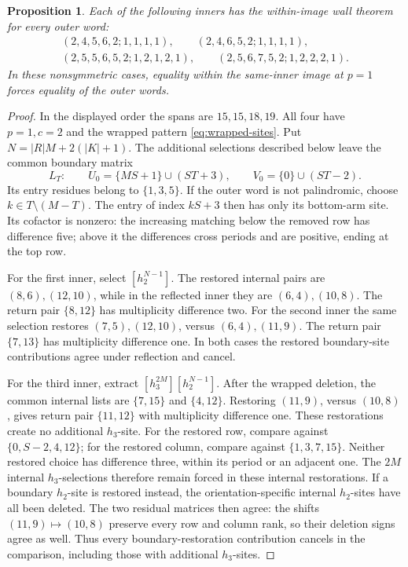 \documentclass[11pt,a4paper]{amsart}
\numberwithin{equation}{section}
\theoremstyle{plain}
\newtheorem{proposition}[theorem]{Proposition}
\theoremstyle{definition}
\begin{document}
\begin{proposition}\label{prop:four-inners}
Each of the following inners has the within-image wall theorem for every outer word:
\[
 \begin{gathered}
 (2,4,5,6,2;1,1,1,1),\qquad(2,4,6,5,2;1,1,1,1),\\
 (2,5,5,6,5,2;1,2,1,2,1),\qquad
 (2,5,6,7,5,2;1,2,2,2,1).
 \end{gathered}
\]
In these nonsymmetric cases, equality within the same-inner image at \(p=1\) forces equality of the outer words.
\end{proposition}
\begin{proof}
In the displayed order the spans are \(15,15,18,19\).  All four have \(p=1,c=2\) and the wrapped pattern \eqref{eq:wrapped-sites}.  Put \(N=|R|M+2(|K|+1)\).  The additional selections described below leave the common boundary matrix
\begin{equation}\label{eq:fixed-boundary-matrix}
 L_T:\qquad U_0=\{MS+1\}\cup(ST+3),\qquad
 V_0=\{0\}\cup(ST-2).
\end{equation}
Its entry residues belong to \(\{1,3,5\}\).  If the outer word is not palindromic, choose \(k\in T\setminus(M-T)\).  The entry of index \(kS+3\) then has only its bottom-arm site.  Its cofactor is nonzero: the increasing matching below the removed row has difference five; above it the differences cross periods and are positive, ending at the top row.

For the first inner, select \([h_2^{N-1}]\).  The restored internal pairs are \((8,6),(12,10)\), while in the reflected inner they are \((6,4),(10,8)\).  The return pair \(\{8,12\}\) has multiplicity difference two.  For the second inner the same selection restores \((7,5),(12,10)\), versus \((6,4),(11,9)\).  The return pair \(\{7,13\}\) has multiplicity difference one.  In both cases the restored boundary-site contributions agree under reflection and cancel.

For the third inner, extract \([h_3^{2M}][h_2^{N-1}]\).  After the wrapped deletion, the common internal lists are \(\{7,15\}\) and \(\{4,12\}\).  Restoring \((11,9)\), versus \((10,8)\), gives return pair \(\{11,12\}\) with multiplicity difference one.  These restorations create no additional \(h_3\)-site.  For the restored row, compare against \(\{0,S-2,4,12\}\); for the restored column, compare against \(\{1,3,7,15\}\).  Neither restored choice has difference three, within its period or an adjacent one.  The \(2M\) internal \(h_3\)-selections therefore remain forced in these internal restorations.  If a boundary \(h_2\)-site is restored instead, the orientation-specific internal \(h_2\)-sites have all been deleted.  The two residual matrices then agree: the shifts \((11,9)\mapsto(10,8)\) preserve every row and column rank, so their deletion signs agree as well.  Thus every boundary-restoration contribution cancels in the comparison, including those with additional \(h_3\)-sites.


\end{proof}
\end{document}
